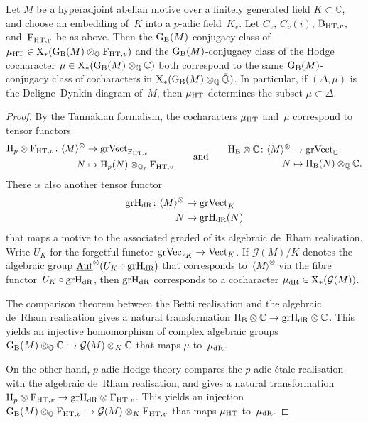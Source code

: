 \documentclass[10pt,twoside,leqno]{article}
\numberwithin{equation}{subsection}
\newcommand{\into}{\hookrightarrow}
\newcommand{\Aut}{\textnormal{Aut}}
\newcommand{\iAut}{\underline{\Aut}}
\newcommand{\QQ}{\mathbb{Q}}
\newcommand{\QQbar}{\bar{\QQ}}
\newcommand{\QQp}{\QQ_{p}}
\newcommand{\CC}{\mathbb{C}}
\newcommand{\HdR}{\HH_{\dR}}
\newcommand{\HT}{\textnormal{HT}}
\newcommand{\BHT}[1]{\textnormal{B}_{\HT,#1}}
\newcommand{\FHT}[1]{\textnormal{F}_{\HT,#1}}
\newcommand{\gr}{\textnormal{gr}}
\newcommand{\Vect}{\textnormal{Vect}}
\newcommand{\grVect}{\textnormal{grVect}}
\newcommand{\Cochar}{\textnormal{X}_{*}}
\newcommand{\dR}{\textnormal{dR}}
\newcommand{\HH}{\textnormal{H}}
\newcommand{\Hp}{\HH_{p}}
\newcommand{\HB}{\HH_{\textnormal{B}}}
\newcommand{\GG}{\textnormal{G}}
\newcommand{\GB}{\GG_{\textnormal{B}}}
\newcommand{\Tangen}[1]{\langle #1 \rangle^{\otimes}}
\begin{document}
\begin{lemma} %
 \label{hodge-tate-cochar-deldyn}
 Let $M$ be a hyperadjoint abelian motive
 over a finitely generated field $K \subset \CC$,
 and choose an embedding of~$K$ into a $p$-adic field~$K_v$.
 Let $C_v$, $C_v(i)$, $\BHT{v}$, and~$\FHT{v}$ be as above.
 Then the $\GB(M)$-conjugacy class of
 $\mu_\HT \in \Cochar(\GB(M) \otimes_\QQ \FHT{v})$
 and the $\GB(M)$-conjugacy class of the Hodge cocharacter
 $\mu \in \Cochar(\GB(M) \otimes_\QQ \CC)$
 both correspond to the same $\GB(M)$-conjugacy class of
 cocharacters in $\Cochar(\GB(M) \otimes_\QQ \QQbar)$.
 In particular, if $(\Delta,\mu)$ is the Deligne--Dynkin diagram of~$M$,
 then $\mu_\HT$ determines the subset $\mu \subset \Delta$.
 \begin{proof}
  By the Tannakian formalism,
  the cocharacters $\mu_\HT$ and~$\mu$ correspond to tensor functors
  \[
   \begin{aligned}
    \Hp \otimes \FHT{v} \colon \Tangen{M} &\to \grVect_{\FHT{v}} \\
    N &\mapsto \Hp(N) \otimes_{\QQp} \FHT{v}
   \end{aligned}
   \qquad\text{and}\qquad
   \begin{aligned}
    \HB \otimes \CC \colon \Tangen{M} &\to \grVect_{\CC} \\
    N &\mapsto \HB(N) \otimes_\QQ \CC.
   \end{aligned}
  \]
  There is also another tensor functor
  \begin{align*}
   \gr\HdR \colon \Tangen{M} &\to \grVect_{K} \\
   N &\mapsto \gr\HdR(N)
  \end{align*}
  that maps a motive to the associated graded
  of its algebraic de~Rham realisation.
  Write $U_K$ for the forgetful functor $\grVect_K \to \Vect_K$.
  If $\mathcal{G}(M)/K$ denotes the algebraic group
  $\iAut^\otimes(U_K \circ \gr\HdR)$
  that corresponds to~$\Tangen{M}$ via the fibre functor~$U_K \circ \gr\HdR$,
  then $\gr\HdR$ corresponds to a cocharacter
  $\mu_\dR \in \Cochar(\mathcal{G}(M))$.

  The comparison theorem between
  the Betti realisation and the algebraic de~Rham realisation
  gives a natural transformation $\HB \otimes \CC \to \gr\HdR \otimes \CC$.
  This yields an injective homomorphism of complex algebraic groups
  $\GB(M) \otimes_\QQ \CC \into \mathcal{G}(M) \otimes_K \CC$
  that maps $\mu$ to~$\mu_\dR$.

  On the other hand, $p$-adic Hodge theory compares
  the $p$-adic \'etale realisation with the algebraic de~Rham realisation,
  and gives a natural transformation
  $\Hp \otimes \FHT{v} \to \gr\HdR \otimes \FHT{v}$.
  This yields an injection
  $\GB(M) \otimes_\QQ \FHT{v} \into \mathcal{G}(M) \otimes_K \FHT{v}$
  that maps $\mu_\HT$ to~$\mu_\dR$.


\end{proof}
\end{lemma}
\end{document}
